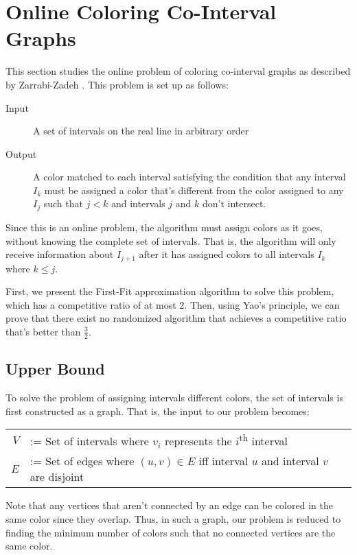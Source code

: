 \section{Online Coloring Co-Interval Graphs}
This section studies the online problem of coloring co-interval graphs as described by Zarrabi-Zadeh \cite{zarrabi}.
This problem is set up as follows:

\begin{description}
	\item[Input] A set of intervals on the real line in arbitrary order
	\item[Output] A color matched to each interval satisfying the condition that any interval $I_k$ must be assigned a color that's different from the color assigned to any $I_j$ such that $j < k$ and intervals $j$ and $k$ don't intersect.
\end{description}

Since this is an online problem, the algorithm must assign colors as it goes, without knowing the complete set of intervals. That is, the algorithm will only receive information about $I_{j+1}$ after it has assigned colors to all intervals $I_k$ where $k \leq j$.

First, we present the First-Fit approximation algorithm to solve this problem, which has a competitive ratio of at most 2. Then, using Yao's principle, we can prove that there exist no randomized algorithm that achieves a competitive ratio that's better than $\frac{3}{2}$.
\subsection{Upper Bound}
To solve the problem of assigning intervals different colors, the set of intervals is first constructed as a graph. That is, the input to our problem becomes:

\begin{center}
	\begin{tabular}{rl}
		$V$ &:= Set of intervals where $v_i$ represents the $i$\textsuperscript{th} interval \\
		$E$ &:= Set of edges where $(u,v) \in E$ iff interval $u$ and interval $v$ are disjoint
	\end{tabular}
\end{center}

Note that any vertices that aren't connected by an edge can be colored in the same color since they overlap. Thus, in such a graph, our problem is reduced to finding the minimum number of colors such that no connected vertices are the same color.

